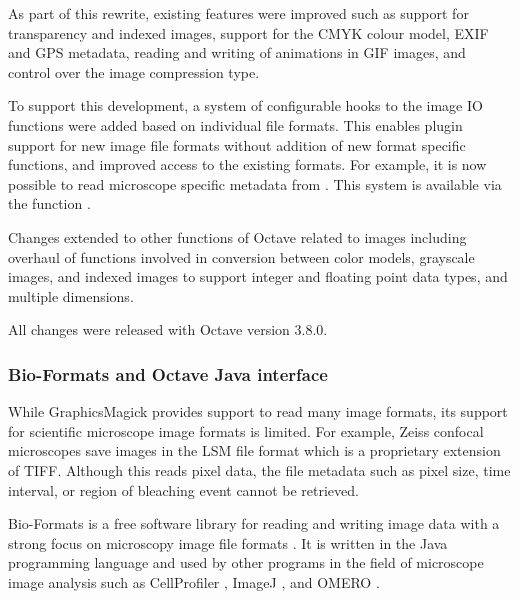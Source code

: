 As part of this rewrite, existing features were improved such as
support for transparency and
indexed images, support for the CMYK colour model, EXIF
and GPS metadata, reading and writing of animations in GIF images, and
control over the image compression type.

To support this development, a system of configurable hooks 
to the image IO 
functions were added based on individual file formats.
This enables plugin  support for new image file formats
without addition of new format specific functions, and improved access
to the existing formats.  For example, it is now possible to read
microscope specific metadata from .
This system is available via the function .

Changes extended to other functions of Octave related to images
including overhaul of functions involved in conversion between color
models, grayscale images, and indexed images to support integer and
floating point data types, and multiple dimensions.


All changes were released with Octave version 3.8.0.


\subsubsection{Bio-Formats and Octave Java interface}

While GraphicsMagick provides support to read many image formats, its
support for scientific microscope image formats is limited.
For example, Zeiss confocal microscopes save
images in the LSM file format which is a proprietary extension of TIFF.
Although this reads pixel data,
the file metadata such as pixel size, time interval, or region of
bleaching event cannot be retrieved.

Bio-Formats is a free software library for reading and writing image
data with a strong focus on microscopy image file formats
\citep{bioformats}.  It is written in the Java programming language and
used by other programs in the field of microscope image analysis such
as CellProfiler \citep{cellprofiler}, ImageJ \cite{imagej2}, and OMERO
\citep{omero}.

